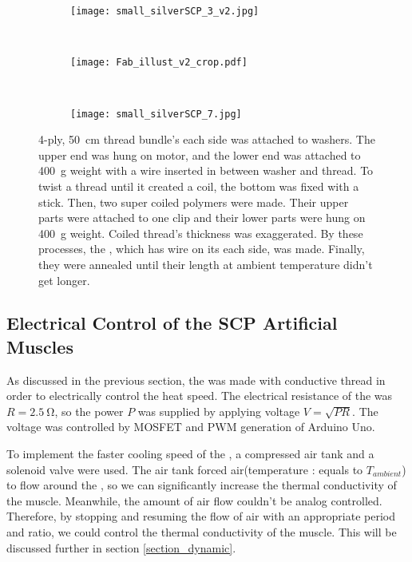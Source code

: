 \begin{figure}
	\centering
	\begin{subfigure}{.15\linewidth}
		\centering\texttt{[image: small\_silverSCP\_3\_v2.jpg]}
		\caption{\label{silverSCP_2}}
	\end{subfigure}
	~
	\begin{subfigure}{.45\linewidth}
		\centering\texttt{[image: Fab\_illust\_v2\_crop.pdf]}
		\caption{\label{silverSCP_illust}}
	\end{subfigure}
	~
	\begin{subfigure}{.15\linewidth}
		\centering\texttt{[image: small\_silverSCP\_7.jpg]}
		\caption{\label{silverSCP_annealing}}
	\end{subfigure}
	\caption[Process of making \scps with silver-painted nylon thread]{ 4-ply, \SI{50}{\centi\meter} thread bundle's each side was attached to washers. The upper end was hung on motor, and the lower end was attached to \SI{400}{\gram} weight with a wire inserted in between washer and thread.  To twist a thread until it created a coil, the bottom was fixed with a stick. Then, two super coiled polymers were made. Their upper parts were attached to one clip and their lower parts were hung on \SI{400}{\gram} weight. Coiled thread's thickness was exaggerated.  By these processes, the \scpnospace, which has wire on its each side, was made. Finally, they were annealed until their length at ambient temperature didn't get longer.}
	\label{silverSCP_makingof}
\end{figure}

\subsection{Electrical Control of the SCP Artificial Muscles}\label{section_electrical_control}
As discussed in the previous section, the \scp was made with conductive thread in order to electrically control the heat speed. The electrical resistance of the \scp was $R=\SI{2.5}{\ohm}$, so the power $P$ was supplied by applying voltage $V=\sqrt{PR}$. The voltage was controlled by MOSFET and PWM generation of Arduino Uno.

To implement the faster cooling speed of the \scp, a compressed air tank and a solenoid valve were used. 
The air tank forced air(temperature : equals to  $T_{ambient}$) to flow around the \scp, so we can significantly increase the thermal conductivity of the muscle. %
Meanwhile, the amount of air flow couldn't be analog controlled. Therefore, by stopping and resuming the flow of air with an appropriate period and ratio, we could control the thermal conductivity of the muscle. This will be discussed further in section \ref{section_dynamic}.

